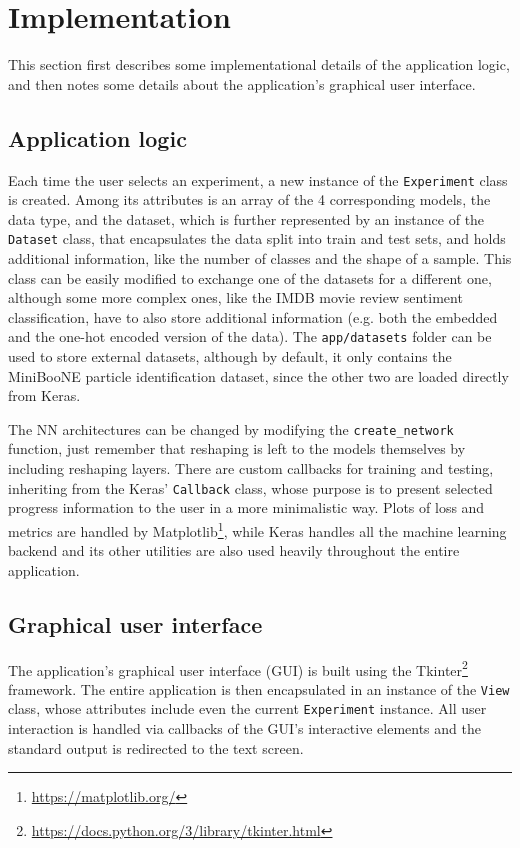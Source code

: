 \section{Implementation}
\label{implementation}
This section first describes some implementational details of the application logic, and then notes some details
about the application's graphical user interface.


\subsection*{Application logic}
\label{application-logic}
Each time the user selects an experiment, a new instance of the \texttt{Experiment} class is created.
Among its attributes is an array of the 4 corresponding models, the data type, and the dataset,
which is further represented by an instance of the \texttt{Dataset} class, that encapsulates the data
split into train and test sets, and holds additional information, like the number of classes and the shape
of a sample. This class can be easily modified to exchange one of the datasets for a different one,
although some more complex ones, like the IMDB movie review sentiment classification, have to also store
additional information (e.g. both the embedded and the one-hot encoded version of the data). The
\texttt{app/datasets}
folder can be used to store external datasets, although by default, it only contains the MiniBooNE particle
identification dataset, since the other two are loaded directly from Keras.

The NN architectures can be changed by modifying the \texttt{create\_network} function,
just remember that reshaping is left to the models themselves by including reshaping layers.
There are custom callbacks for training and testing, inheriting from the Keras' \texttt{Callback} class,
whose purpose is to present selected progress information to the user in a more minimalistic way.
Plots of loss and metrics are handled by Matplotlib\footnote{\url{https://matplotlib.org/}},
while Keras handles all the machine learning backend and its other utilities are also used heavily throughout
the entire application.


\subsection*{Graphical user interface}
\label{graphical-user-interface}
The application's graphical user interface (GUI) is built using the
Tkinter\footnote{\url{https://docs.python.org/3/library/tkinter.html}} framework.
The entire application is then encapsulated in an instance of the \texttt{View} class,
whose attributes include even the current \texttt{Experiment} instance.
All user interaction is handled via callbacks of the GUI's interactive elements and the standard
output is redirected to the text screen.

